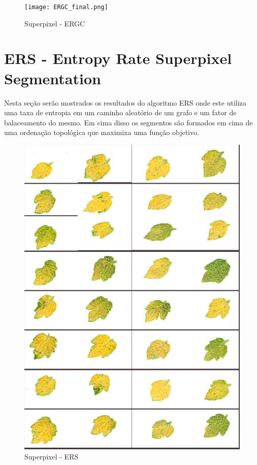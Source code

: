 \documentclass[a4paper, 12pt]{article}
\begin{document}
		\begin{figure}[H]
			\centering
			\texttt{[image: ERGC\_final.png]}
			\caption{Superpixel - ERGC}
		\end{figure}



    \section*{ERS - Entropy Rate Superpixel Segmentation}
    Nesta seção serão mostrados os resultados do algoritmo ERS onde este utiliza uma taxa
     de entropia em um caminho aleatório de um grafo e um fator de balaceamento do mesmo.
     Em cima disso os segmentos são formados em cima de uma ordenação topológica que maximixa
     uma função objetivo.

		\begin{figure}[H]
			\centering
			\includegraphics[width=1\linewidth]{ERS_final.png}
			\caption{Superpixel - ERS}
		\end{figure}
\end{document}
